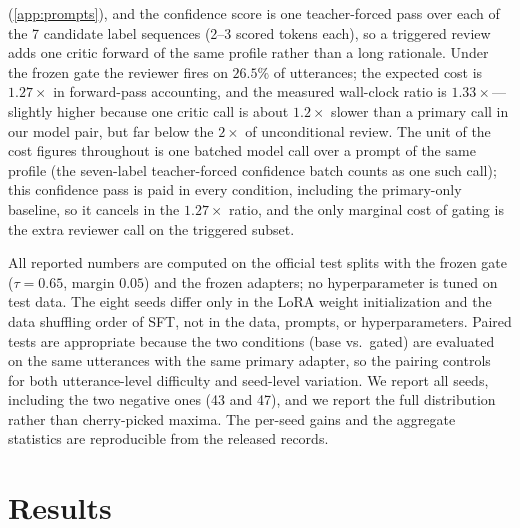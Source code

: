 \documentclass[final,5p,times,twocolumn]{elsarticle}
\begin{document}
(\ref{app:prompts}), and the confidence score is one
teacher-forced pass over each of the 7 candidate label sequences (2--3
scored tokens each), so a triggered review adds one critic forward of the
same profile rather than a long rationale. Under the frozen gate the
reviewer fires on $26.5\%$ of utterances; the expected cost is
$1.27\times$ in forward-pass accounting, and the measured wall-clock ratio
is $1.33\times$---slightly higher because one critic call is about
$1.2\times$ slower than a primary call in our model pair, but far below
the $2\times$ of unconditional review. The unit of the cost figures throughout is
one batched model call over a prompt of the same profile (the seven-label
teacher-forced confidence batch counts as one such call); this confidence
pass is paid in every condition, including the primary-only baseline, so it
cancels in the $1.27\times$ ratio, and the only marginal cost of gating is
the extra reviewer call on the triggered subset.

All reported numbers are computed on the official test splits with the
frozen gate ($\tau{=}0.65$, margin $0.05$) and the frozen adapters; no
hyperparameter is tuned on test data. The eight seeds differ only in the
LoRA weight initialization and the data shuffling order of SFT, not in the
data, prompts, or hyperparameters. Paired tests are appropriate because the
two conditions (base vs.\ gated) are evaluated on the same utterances with
the same primary adapter, so the pairing controls for both utterance-level
difficulty and seed-level variation. We report all seeds, including the two
negative ones (43 and 47), and we report the full distribution rather than
cherry-picked maxima. The per-seed gains and the aggregate statistics are
reproducible from the released records.

\section{Results}
\label{sec:results}
\end{document}
